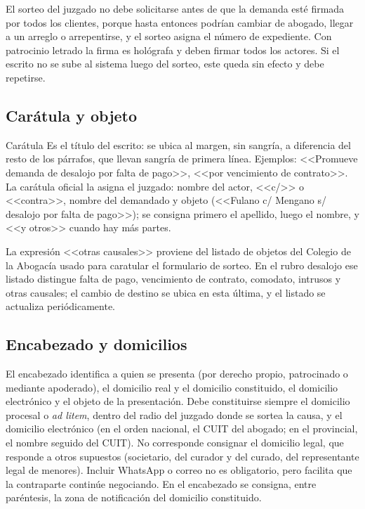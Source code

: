 \documentclass[12pt,oneside]{book}
\begin{document}
El sorteo del juzgado no debe solicitarse antes de que la demanda esté firmada por todos los clientes, porque hasta entonces podrían cambiar de abogado, llegar a un arreglo o arrepentirse, y el sorteo asigna el número de expediente. Con patrocinio letrado la firma es hológrafa y deben firmar todos los actores. Si el escrito no se sube al sistema luego del sorteo, este queda sin efecto y debe repetirse.

\subsection{Carátula y objeto}

\begin{definition}{Carátula}
Es el título del escrito: se ubica al margen, sin sangría, a diferencia del resto de los párrafos, que llevan sangría de primera línea. Ejemplos: <<Promueve demanda de desalojo por falta de pago>>, <<por vencimiento de contrato>>. La carátula oficial la asigna el juzgado: nombre del actor, <<c/>> o <<contra>>, nombre del demandado y objeto (<<Fulano c/ Mengano s/ desalojo por falta de pago>>); se consigna primero el apellido, luego el nombre, y <<y otros>> cuando hay más partes.
\end{definition}

La expresión <<otras causales>> proviene del listado de objetos del Colegio de la Abogacía usado para caratular el formulario de sorteo. En el rubro desalojo ese listado distingue falta de pago, vencimiento de contrato, comodato, intrusos y otras causales; el cambio de destino se ubica en esta última, y el listado se actualiza periódicamente.

\subsection{Encabezado y domicilios}

El encabezado identifica a quien se presenta (por derecho propio, patrocinado o mediante apoderado), el domicilio real y el domicilio constituido, el domicilio electrónico y el objeto de la presentación. Debe constituirse siempre el domicilio procesal o \emph{ad litem}, dentro del radio del juzgado donde se sortea la causa, y el domicilio electrónico (en el orden nacional, el CUIT del abogado; en el provincial, el nombre seguido del CUIT). No corresponde consignar el domicilio legal, que responde a otros supuestos (societario, del curador y del curado, del representante legal de menores). Incluir WhatsApp o correo no es obligatorio, pero facilita que la contraparte continúe negociando. En el encabezado se consigna, entre paréntesis, la zona de notificación del domicilio constituido.
\end{document}
